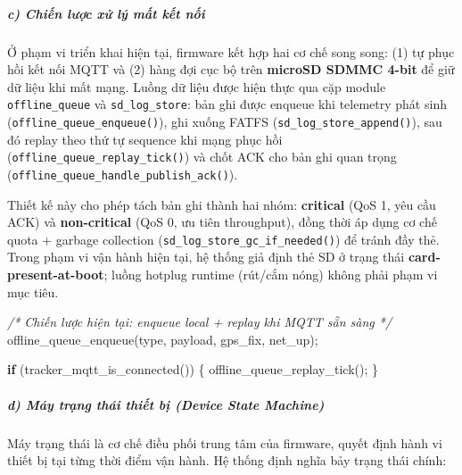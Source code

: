 \documentclass[13pt,a4paper]{extarticle}
\newenvironment{Shaded}{}{}
\newcommand{\CommentTok}[1]{\textcolor[rgb]{0.38,0.63,0.69}{\textit{#1}}}
\newcommand{\ControlFlowTok}[1]{\textcolor[rgb]{0.00,0.44,0.13}{\textbf{#1}}}
\newcommand{\NormalTok}[1]{#1}
\newcommand{\OperatorTok}[1]{\textcolor[rgb]{0.40,0.40,0.40}{#1}}
\renewcommand{\\}{\thesislongtableorignewline\hline}%
\begin{document}
\subparagraph{c) Chiến lược xử lý mất kết
nối}\label{c-chiux1ebfn-lux1b0ux1ee3c-xux1eed-luxfd-mux1ea5t-kux1ebft-nux1ed1i}

Ở phạm vi triển khai hiện tại, firmware kết hợp hai cơ chế song song:
(1) tự phục hồi kết nối MQTT và (2) hàng đợi cục bộ trên \textbf{microSD
SDMMC 4-bit} để giữ dữ liệu khi mất mạng. Luồng dữ liệu được hiện thực
qua cặp module \texttt{offline\_queue} và \texttt{sd\_log\_store}: bản
ghi được enqueue khi telemetry phát sinh
(\texttt{offline\_queue\_enqueue()}), ghi xuống FATFS
(\texttt{sd\_log\_store\_append()}), sau đó replay theo thứ tự sequence
khi mạng phục hồi (\texttt{offline\_queue\_replay\_tick()}) và chốt ACK
cho bản ghi quan trọng
(\texttt{offline\_queue\_handle\_publish\_ack()}).

Thiết kế này cho phép tách bản ghi thành hai nhóm: \textbf{critical}
(QoS 1, yêu cầu ACK) và \textbf{non-critical} (QoS 0, ưu tiên
throughput), đồng thời áp dụng cơ chế quota + garbage collection
(\texttt{sd\_log\_store\_gc\_if\_needed()}) để tránh đầy thẻ. Trong phạm
vi vận hành hiện tại, hệ thống giả định thẻ SD ở trạng thái
\textbf{card-present-at-boot}; luồng hotplug runtime (rút/cắm nóng)
không phải phạm vi mục tiêu.

\begin{Shaded}
\begin{Highlighting}[]
\CommentTok{/* Chiến lược hiện tại: enqueue local + replay khi MQTT sẵn sàng */}
\NormalTok{offline\_queue\_enqueue}\OperatorTok{(}\NormalTok{type}\OperatorTok{,}\NormalTok{ payload}\OperatorTok{,}\NormalTok{ gps\_fix}\OperatorTok{,}\NormalTok{ net\_up}\OperatorTok{);}

\ControlFlowTok{if} \OperatorTok{(}\NormalTok{tracker\_mqtt\_is\_connected}\OperatorTok{())} \OperatorTok{\{}
\NormalTok{    offline\_queue\_replay\_tick}\OperatorTok{();}
\OperatorTok{\}}
\end{Highlighting}
\end{Shaded}

\subparagraph{d) Máy trạng thái thiết bị (Device State
Machine)}\label{d-muxe1y-trux1ea1ng-thuxe1i-thiux1ebft-bux1ecb-device-state-machine}

Máy trạng thái là cơ chế điều phối trung tâm của firmware, quyết định
hành vi thiết bị tại từng thời điểm vận hành. Hệ thống định nghĩa bảy
trạng thái chính:
\end{document}
